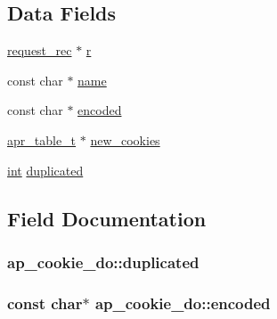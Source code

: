 \subsection*{Data Fields}
\begin{DoxyCompactItemize}
\item 
\hyperlink{structrequest__rec}{request\+\_\+rec} $\ast$ \hyperlink{structap__cookie__do_aa698d250280da6b18ab9cf1a959fed2f}{r}
\item 
const char $\ast$ \hyperlink{structap__cookie__do_a8f60775ec09c55a8f6f5f75feb9c52fc}{name}
\item 
const char $\ast$ \hyperlink{structap__cookie__do_a793af37d6f49737745384380698890bf}{encoded}
\item 
\hyperlink{structapr__table__t}{apr\+\_\+table\+\_\+t} $\ast$ \hyperlink{structap__cookie__do_a4142e77631074973b28c9f377d1ece7b}{new\+\_\+cookies}
\item 
\hyperlink{pcre_8txt_a42dfa4ff673c82d8efe7144098fbc198}{int} \hyperlink{structap__cookie__do_a173896981843ad26d22dcb127eb82247}{duplicated}
\end{DoxyCompactItemize}


\subsection{Field Documentation}
\subsubsection[{\texorpdfstring{duplicated}{duplicated}}]{ ap\+\_\+cookie\+\_\+do\+::duplicated}\hypertarget{structap__cookie__do_a173896981843ad26d22dcb127eb82247}{}\label{structap__cookie__do_a173896981843ad26d22dcb127eb82247}
\subsubsection[{\texorpdfstring{encoded}{encoded}}]{\setlength{\rightskip}{0pt plus 5cm}const char$\ast$ ap\+\_\+cookie\+\_\+do\+::encoded}\hypertarget{structap__cookie__do_a793af37d6f49737745384380698890bf}{}\label{structap__cookie__do_a793af37d6f49737745384380698890bf}
